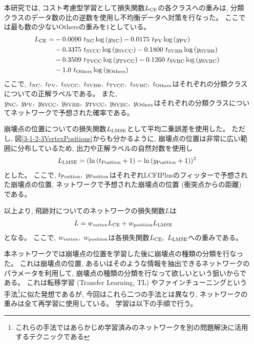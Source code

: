 本研究では, コスト考慮型学習として損失関数$L_{\rm CE}$の各クラスへの重みは, 分類クラスのデータ数の比の逆数を使用し不均衡データへ対策を行なった。
ここでは最も数の少ないOthersの重みを$1$としている。
\begin{equation}
 \begin{split}
 L_{\rm CE} = & - 0.0090\  t_{\rm NC} \log{(y_{\rm NC})} - 0.0175\  t_{\rm PV} \log{(y_{\rm PV})} \\
       & - 0.3375\  t_{\rm SVCC} \log{(y_{\rm SVCC})} - 0.1800\  t_{\rm SVBB} \log{(y_{\rm SVBB})}\\
       & - 0.3509\  t_{\rm TVCC} \log{(y_{\rm TVCC})} - 0.1260\  t_{\rm SVBC} \log{(y_{\rm SVBC})}\\
       & - 1.0\  t_{\rm Others} \log{(y_{\rm Others})}\\
 \end{split}
\end{equation}
ここで, $t_{\rm NC},\ t_{\rm PV},\ t_{\rm SVCC},\ t_{\rm SVBB},\ t_{\rm TVCC},\ t_{\rm SVBC},\ t_{\rm Others}$はそれぞれの分類クラスについての正解ラベルである。
また, $y_{\rm NC},\ y_{\rm PV},\ y_{\rm SVCC},\ y_{\rm SVBB},\ y_{\rm TVCC},\ y_{\rm SVBC},\ y_{\rm Others}$はそれぞれの分類クラスについてネットワークで予想された確率である。

崩壊点の位置についての損失関数$L_{\rm LMSE}$として平均二乗誤差を使用した。
ただし, 図\ref{3-1-2-3VertexPositions}からも分かるように, 崩壊点の位置は非常に広い範囲に分布しているため, 出力や正解ラベルの自然対数を使用し
\begin{equation}
 \begin{split}
 L_{\rm LMSE} = (\ln{(t_{\rm Position}+1)} - \ln{(y_{\rm Position}+1)})^2
 \end{split}
\end{equation}
とした。
ここで, $t_{\rm Position},\ y_{\rm Position}$はそれぞれLCFIPlusのフィッターで予想された崩壊点の位置, ネットワークで予想された崩壊点の位置 (衝突点からの距離) である。

以上より, 飛跡対についてのネットワークの損失関数$L$は
\begin{equation}
 \begin{split}
 L & = w_{\rm vertex} L_{\rm CE} + w_{\rm position} L_{\rm LMSE}
 \end{split}
\end{equation}
となる。
ここで, $w_{\rm vertex},\ w_{\rm position}$は各損失関数$L_{\rm CE},\ L_{\rm LMSE}$への重みである。

本ネットワークでは崩壊点の位置を学習した後に崩壊点の種類の分類を行なった。
これは崩壊点の位置, あるいはそのような情報を抽出できるネットワークのパラメータを利用して, 崩壊点の種類の分類を行なって欲しいという狙いからである。
これは転移学習 (Transfer Learning, TL) やファインチューニングという手法\footnote{これらの手法ではあらかじめ学習済みのネットワークを別の問題解決に活用するテクニックである}に似た発想であるが, 今回はこれら二つの手法とは異なり, ネットワークの重みは全て再学習に使用している。
学習は以下の手順で行う。

